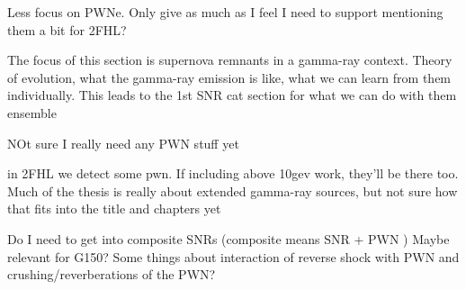 Less focus on PWNe. Only give as much as I feel I need to support mentioning them a bit for 2FHL?

The focus of this section is supernova remnants in a gamma-ray context. Theory of evolution, what the gamma-ray emission is like, what we can learn from them individually.  This leads to the 1st SNR cat section for what we can do with them ensemble

NOt sure I really need any PWN stuff yet

in 2FHL we detect some pwn. If including above 10gev work, they'll be there too. Much of the thesis is really about extended gamma-ray sources, but not sure how that fits into the title and chapters yet

Do I need to get into composite SNRs (composite means SNR + PWN ) Maybe relevant for G150? Some things about interaction of reverse shock with PWN and crushing/reverberations of the PWN?

\cite{Montmerle79}